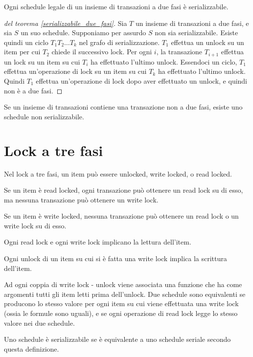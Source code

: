 \begin{theorem}
\label{serializzabile_due_fasi}
Ogni schedule legale di un insieme di transazioni a due fasi \`e serializzabile.
\end{theorem}

\begin{proof}[del teorema \ref{serializzabile_due_fasi}]
Sia $T$ un insieme di transazioni a due fasi, e sia $S$ un suo schedule. Supponiamo per assurdo $S$ non sia serializzabile. Esiste quindi un ciclo $T_1 T_2 \ldots T_k$ nel grafo di serializzazione. $T_1$ effettua un unlock su un item per cui $T_2$ chiede il successivo lock. Per ogni $i$, la transazione $T_{i+1}$ effettua un lock su un item su cui $T_i$ ha effettuato l'ultimo unlock. Essendoci un ciclo, $T_1$ effettua un'operazione di lock su un item su cui $T_k$ ha effettuato l'ultimo unlock. Quindi $T_1$ effettua un'operazione di lock dopo aver effettuato un unlock, e quindi non \`e a due fasi.
\end{proof}

Se un insieme di transazioni contiene una transazione non a due fasi, esiste uno schedule non serializzabile. 

\section{Lock a tre fasi}

Nel lock a tre fasi, un item pu\`o essere unlocked, write locked, o read locked.

Se un item \`e read locked, ogni transazione pu\`o ottenere un read lock su di esso, ma nessuna transazione pu\`o ottenere un write lock.

Se un item \`e write locked, nessuna transazione pu\`o ottenere un read lock o un write lock su di esso.

Ogni read lock e ogni write lock implicano la lettura dell'item.

Ogni unlock di un item su cui si \`e fatta una write lock implica la scrittura dell'item.

Ad ogni coppia di write lock - unlock viene associata una funzione che ha come argomenti tutti gli item letti prima dell'unlock. Due schedule sono equivalenti se producono lo stesso valore per ogni item su cui viene effettuata una write lock (ossia le formule sono uguali), e se ogni operazione di read lock legge lo stesso valore nei due schedule.

Uno schedule \`e serializzabile se \`e equivalente a uno schedule seriale secondo questa definizione.

